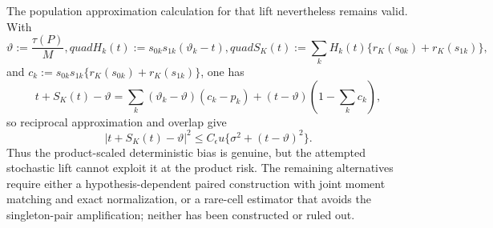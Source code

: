 The population approximation calculation for that lift nevertheless remains valid.  With
\[
 \vartheta:=\frac{\tau(P)}M,quad
 H_k(t):=s_{0k}s_{1k}(\vartheta_k-t),quad
 S_K(t):=\sum_kH_k(t)\{r_K(s_{0k})+r_K(s_{1k})\},
\]
and \(c_k:=s_{0k}s_{1k}\{r_K(s_{0k})+r_K(s_{1k})\}\), one has
\[
 t+S_K(t)-\vartheta
 =\sum_k(\vartheta_k-\vartheta)(c_k-p_k)
 +(t-\vartheta)\left(1-\sum_kc_k\right),
\]
so reciprocal approximation and overlap give
\[
 |t+S_K(t)-\vartheta|^2
 \le C_{\epsilon}u\{\sigma^2+(t-\vartheta)^2\}.
\tag{9}
\]
Thus the product-scaled deterministic bias is genuine, but the attempted stochastic lift cannot exploit it at the product risk.  The remaining alternatives require either a hypothesis-dependent paired construction with joint moment matching and exact normalization, or a rare-cell estimator that avoids the singleton-pair amplification; neither has been constructed or ruled out.